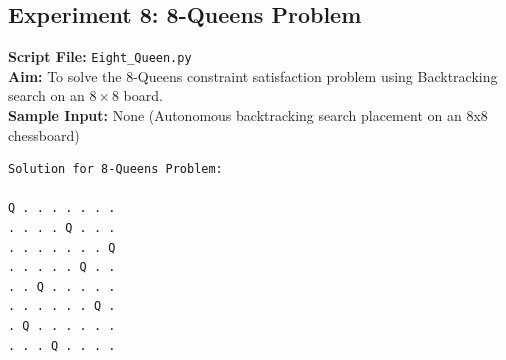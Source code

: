 \subsection*{Experiment 8: 8-Queens Problem}
\textbf{Script File:} \texttt{Eight_Queen.py} \\[4pt]
\textbf{Aim:} To solve the 8-Queens constraint satisfaction problem using Backtracking search on an $8 \times 8$ board. \\[4pt]
\textbf{Sample Input:} None (Autonomous backtracking search placement on an 8x8 chessboard) \\[6pt]
\begin{tcolorbox}[colback=black!5!white,colframe=black!75!white,title=Terminal Execution Output - 8-Queens Problem]
\begin{verbatim}
Solution for 8-Queens Problem:

Q . . . . . . .
. . . . Q . . .
. . . . . . . Q
. . . . . Q . .
. . Q . . . . .
. . . . . . Q .
. Q . . . . . .
. . . Q . . . .
\end{verbatim}
\end{tcolorbox}

